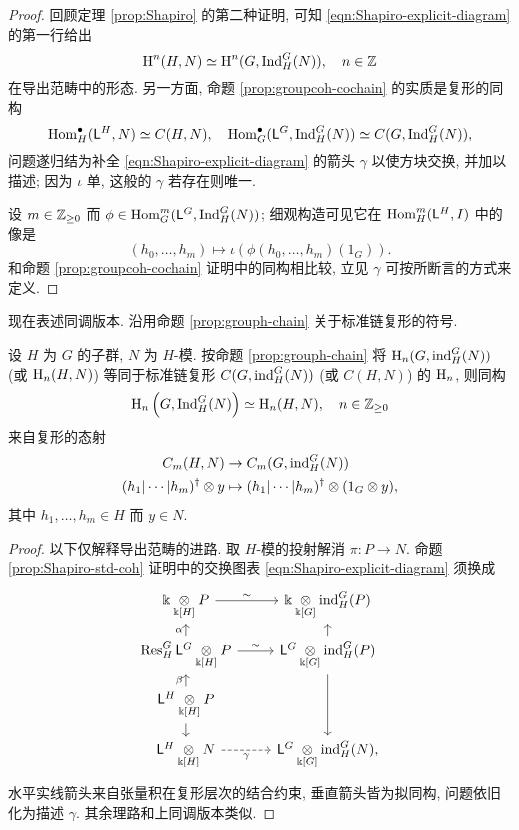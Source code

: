 \begin{proof}
	回顾定理 \ref{prop:Shapiro} 的第二种证明, 可知 \eqref{eqn:Shapiro-explicit-diagram} 的第一行给出
	\[ \operatorname{H}^n(H, N) \simeq \operatorname{H}^n(G, \operatorname{Ind}^G_H(N)), \quad n \in \mathbb{Z} \]
	在导出范畴中的形态. 另一方面, 命题 \ref{prop:groupcoh-cochain} 的实质是复形的同构
	\[ \operatorname{Hom}^\bullet_H(\mathsf{L}^H, N) \simeq C(H, N), \quad \operatorname{Hom}^\bullet_G(\mathsf{L}^G, \operatorname{Ind}^G_H(N)) \simeq C(G, \operatorname{Ind}^G_H(N)), \]
	问题遂归结为补全 \eqref{eqn:Shapiro-explicit-diagram} 的箭头 $\gamma$ 以使方块交换, 并加以描述; 因为 $\iota$ 单, 这般的 $\gamma$ 若存在则唯一.
	
	设 $m \in \mathbb{Z}_{\geq 0}$ 而 $\phi \in \operatorname{Hom}^m_G(\mathsf{L}^G, \operatorname{Ind}^G_H(N))$; 细观构造可见它在 $\operatorname{Hom}^m_H(\mathsf{L}^H, I)$ 中的像是
	\[ (h_0, \ldots, h_m) \mapsto \iota\left(\phi(h_0, \ldots, h_m)(1_G)\right). \]
	和命题 \ref{prop:groupcoh-cochain} 证明中的同构相比较, 立见 $\gamma$ 可按所断言的方式来定义.
\end{proof}

现在表述同调版本. 沿用命题 \ref{prop:grouph-chain} 关于标准链复形的符号.

\begin{proposition}\label{prop:Shapiro-std-ho}
	设 $H$ 为 $G$ 的子群, $N$ 为 $H$-模. 按命题 \ref{prop:grouph-chain} 将 $\operatorname{H}_n(G, \operatorname{ind}^G_H(N))$ (或 $\operatorname{H}_n(H, N)$) 等同于标准链复形 $C(G, \operatorname{ind}^G_H(N))$ (或 $C(H, N)$) 的 $\operatorname{H}_n$, 则同构
	\[ \operatorname{H}_n\left(G, \operatorname{Ind}^G_H(N)\right) \simeq \operatorname{H}_n(H, N), \quad n \in \mathbb{Z}_{\geq 0} \]
	来自复形的态射
	\begin{align*}
		C_m(H, N) & \to C_m(G, \operatorname{ind}^G_H(N)) \\
		(h_1 | \cdots | h_m)^\dagger \otimes y & \mapsto (h_1 | \cdots |h_m)^\dagger \otimes (1_G \otimes y),
	\end{align*}
	其中 $h_1, \ldots, h_m \in H$ 而 $y \in N$.
\end{proposition}
\begin{proof}
	以下仅解释导出范畴的进路. 取 $H$-模的投射解消 $\pi: P \to N$. 命题 \ref{prop:Shapiro-std-coh} 证明中的交换图表 \eqref{eqn:Shapiro-explicit-diagram} 须换成
	\begin{equation*}\begin{tikzcd}[row sep=small]
		\Bbbk \dotimes{\Bbbk[H]} P \arrow[r, "\sim"] & \Bbbk \dotimes{\Bbbk[G]} \iInd^G_H(P) \\
		\Res^G_H \mathsf{L}^G \dotimes{\Bbbk[H]} P \arrow[r, "\sim"] \arrow[u, "\alpha"] & \mathsf{L}^G \dotimes{\Bbbk[G]} \iInd^G_H(P) \arrow[u] \arrow[dd] \\
		\mathsf{L}^H \dotimes{\Bbbk[H]} P \arrow[u, "\beta"] \arrow[d] & \\
		\mathsf{L}^H \dotimes{\Bbbk[H]} N \arrow[dashed, r, "\gamma"'] & \mathsf{L}^G \dotimes{\Bbbk[G]} \iInd^G_H(N),
	\end{tikzcd}\end{equation*}
	水平实线箭头来自张量积在复形层次的结合约束, 垂直箭头皆为拟同构, 问题依旧化为描述 $\gamma$. 其余理路和上同调版本类似.
\end{proof}

